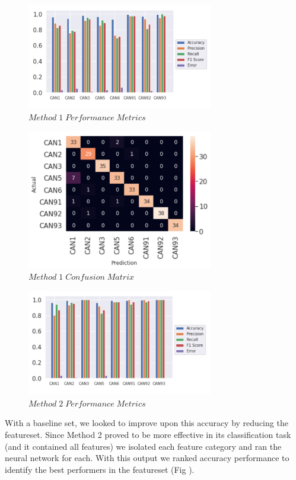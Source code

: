 \documentclass[conference]{IEEEtran}
\begin{document}
\begin{figure}[htb]
\centering
\includegraphics[width=3.2in]{figures/81_m1pm.png}
\caption{$Method\;1\;Performance\;Metrics$}
\label{fig:M1pm}
\end{figure}

\begin{figure}[htb]
\centering
\includegraphics[width=3.2in]{figures/82_m2cm.png}
\caption{$Method\;1\;Confusion\;Matrix$}
\label{fig:M2cm}
\end{figure}

\begin{figure}[htb]
\centering
\includegraphics[width=3.2in]{figures/83_m2pm.png}
\caption{$Method\;2\;Performance\;Metrics$}
\label{fig:M2pm}
\end{figure}

With a baseline set, we looked to improve upon this accuracy by reducing the featureset. Since Method 2 proved to be more effective in its classification task (and it contained all features) we isolated each feature category and ran the neural network for each. With this output we ranked accuracy performance to identify the best performers in the featureset (Fig ).
\end{document}
